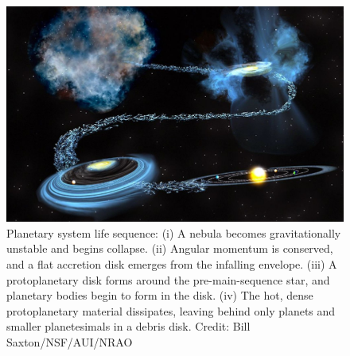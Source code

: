 \documentclass[12pt,oneside]{book}
\begin{document}
  \begin{figure}
  \includegraphics[width=\linewidth]{../figures/disk_evolution}
  \caption{Planetary system life sequence: (i) A nebula becomes gravitationally unstable and begins collapse. (ii) Angular momentum is conserved, and a flat accretion disk emerges from the infalling envelope. (iii) A protoplanetary disk forms around the pre-main-sequence star, and planetary bodies begin to form in the disk. (iv) The hot, dense protoplanetary material dissipates, leaving behind only planets and smaller planetesimals in a debris disk. Credit: Bill Saxton/NSF/AUI/NRAO}
  \label{fig: evolution}
\end{figure}
\end{document}
